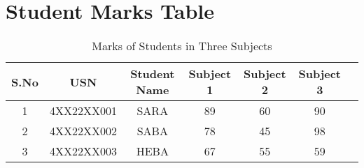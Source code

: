 \documentclass[a4paper,12pt]{article}
\begin{document}
\section*{Student Marks Table}

\begin{table}[h!]
\centering
\caption{Marks of Students in Three Subjects}
\begin{tabular}{|c|c|c|c|c|c|c|}
\hline
\textbf{S.No} & \textbf{USN} & \textbf{Student Name} & \textbf{Subject 1} & \textbf{Subject 2} & \textbf{Subject 3} \\
\hline
1 & 4XX22XX001 & SARA & 89 & 60 & 90 \\
2 & 4XX22XX002 & SABA & 78 & 45 & 98 \\
3 & 4XX22XX003 & HEBA & 67 & 55 & 59 \\
\hline
\end{tabular}
\end{table}
\end{document}

